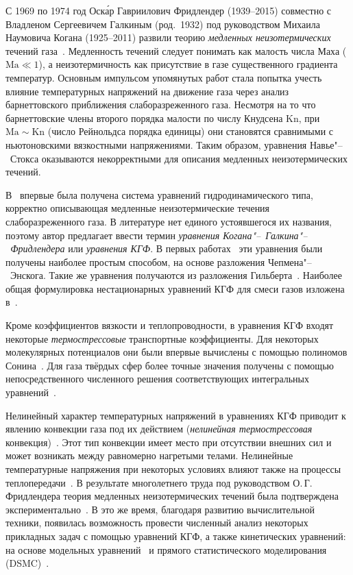 \documentclass[
aps,%
12pt,%
final,%
notitlepage,%
oneside,%
onecolumn,%
nobibnotes,%
nofootinbib,%
superscriptaddress,%
noshowpacs,%
showkeys,%
floatfix,%
tightenlines,%
centertags]%
{revtex4}
\newcommand{\Kn}{\mathrm{Kn}}
\newcommand{\Ma}{\mathrm{Ma}}
\begin{document}
С 1969 по 1974 год Оск\'{а}р Гавриилович Фридлендер (1939--2015)
совместно с Владленом Сергеевичем Галкиным (род.~1932)
под руководством Михаила Наумовича Когана (1925--2011)
развили теорию \emph{медленных неизотермических}
течений газа~\cite{Kogan1970, Kogan1971, Friedlander1974, Galkin1974, Kogan1976}.
Медленность течений следует понимать как малость числа Маха (\(\Ma\ll1\)),
а неизотермичность как присутствие в газе существенного градиента температур.
Основным импульсом упомянутых работ стала попытка учесть влияние температурных напряжений
на движение газа через анализ барнеттовского приближения слаборазреженного газа.
Несмотря на то что барнеттовские члены второго порядка малости по числу Кнудсена \(\Kn\),
при \(\Ma\sim\Kn\) (число Рейнольдса порядка единицы)
они становятся сравнимыми с ньютоновскими вязкостными напряжениями.
Таким образом, уравнения Навье"--~Стокса оказываются некорректными для
описания медленных неизотермических течений.

В~\cite{Kogan1970} впервые была получена система уравнений гидродинамического типа,
корректно описывающая медленные неизотермические течения слаборазреженного газа.
В литературе нет единого устоявшегося их названия,
поэтому автор предлагает ввести термин \emph{уравнения Когана"--~Галкина"--~Фридлендера}
или \emph{уравнения КГФ}.
В первых работах~\cite{Kogan1970, Kogan1971} эти уравнения были получены наиболее простым способом,
на основе разложения Чепмена"--~Энскога. Такие же уравнения получаются из разложения Гильберта~\cite{Galkin1974}.
Наиболее общая формулировка нестационарных уравнений КГФ для смеси газов изложена в~\cite{Galkin2015}.

Кроме коэффициентов вязкости и теплопроводности, в уравнения КГФ входят некоторые
\emph{термострессовые} транспортные коэффициенты. Для некоторых молекулярных потенциалов они
были впервые вычислены с помощью полиномов Сонина~\cite{Burnett1935, Chapman1960}.
Для газа твёрдых сфер более точные значения получены с помощью
непосредственного численного решения соответствующих интегральных уравнений~\cite{Sone1996, Sone2002, Sone2007}.

Нелинейный характер температурных напряжений в уравнениях КГФ приводит к
явлению конвекции газа под их действием (\emph{нелинейная термострессовая} конвекция)~\cite{Kogan1971}.
Этот тип конвекции имеет место при отсутствии внешних сил и может возникать между равномерно нагретыми телами.
Нелинейные температурные напряжения при некоторых условиях влияют также на процессы теплопередачи~\cite{Friedlander1978}.
В результате многолетнего труда под руководством О.\,Г. Фридлендера теория медленных неизотермических течений
была подтверждена экспериментально~\cite{Friedlander1997, Friedlander2003}.
В это же время, благодаря развитию вычислительной техники, появилась возможность провести численный анализ
некоторых прикладных задач с помощью уравнений КГФ, а также кинетических уравнений:
на основе модельных уравнений~\cite{Alexandrov2002, Aoki2006, Alexandrov2008b, Alexandrov2011, Rykov2008}
и прямого статистического моделирования (DSMC)~\cite{Alexandrov2008a, Aoki2007}.
\end{document}
